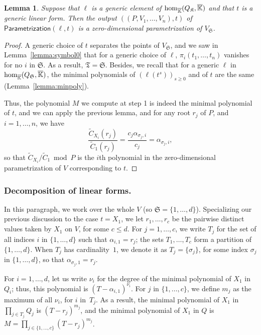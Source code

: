 \documentclass[12pt]{article}
\newtheorem{Lemma}{Lemma}
\def\Kbar {{\ensuremath{\overline{\mathbb{K}}}}}
\begin{document}
\begin{Lemma}
	Suppose that $\ell$ is a generic element of ${\rm
		hom}_{\Kbar}(Q_\mathfrak{K},\Kbar)$ and that $t$ is a generic
	linear form. Then the output $((P,V_1,\dots,V_n),t)$ of
	$\mathsf{Parametrization}(\ell,t)$ is a zero-dimensional
	parametrization of $V_{\mathfrak{S}}$.
\end{Lemma}
\begin{proof}
	A generic choice of $t$ separates the points of $V_{\mathfrak{S}}$,
	and we saw in Lemma~\ref{lemma:symbol0} that for a generic choice of
	$\ell$, $\pi_i(t_1,\dots,t_n)$ vanishes for no $i$ in
	$\mathfrak{S}$.  As a result, $\mathfrak{T}=\mathfrak{S}$.  Besides,
	we recall that for a generic $\ell$ in ${\rm
		hom}_{\Kbar}(Q_\mathfrak{S},\Kbar)$, the minimal polynomials of
	$(\ell(t^s))_{s \ge 0}$ and of $t$ are the same
	(Lemma~\ref{lemma:minpoly}).
	
	Thus, the polynomial $M$ we compute at step 1 is indeed the minimal
	polynomial of $t$, and we can apply the previous lemma, and for 
	any root $r_j$ of $P$, and $i=1,\dots,n$, we have
	$$\frac{\tilde C_{X_i}(r_j)}{\tilde C_1(r_j)}  = \frac{c_j \alpha_{\sigma_j,i}}{c_j} = \alpha_{\sigma_j,i},$$
	so that $\tilde C_{X_i}/\tilde C_1 \bmod P$ is the $i$th polynomial in
	the zero-dimensional parametrization of $V$ corresponding to $t$.
\end{proof}

\subsubsection{Decomposition of linear forms.}

In this paragraph, we work over the whole $V$ (so
$\mathfrak{S}=\{1,\dots,d\}$).  Specializing our previous discussion
to the case $t=X_1$, we let $r_1,\dots,r_c$ be the pairwise distinct
values taken by $X_1$ on $V$, for some $c \le d$.  For
$j=1,\dots,c$, we write $T_j$ for the set of all indices $i$ in
$\{1,\dots,d\}$ such that $\alpha_{i,1}=r_j$; the sets $T_1,\dots,T_c$
form a partition of $\{1,\dots,d\}$. When $T_j$ has cardinality~$1$,
we denote it as $T_j=\{\sigma_j\}$, for some index $\sigma_j$ in
$\{1,\dots,d\}$, so that $\alpha_{\sigma_j,1}=r_j$.

For $i=1,\dots,d$, let us write $\nu_i$ for the degree of the minimal
polynomial of $X_1$ in $Q_i$; thus, this polynomial is
$(T-\alpha_{i,1})^{\nu_i}$. For $j$ in $\{1,\dots,c\}$, we define
$m_j$ as the maximum of all $\nu_i$, for $i$ in~$T_j$. As a result, the minimal
polynomial of $X_1$ in $\prod_{j \in T_j} Q_j$ is 
$(T-r_j)^{m_j}$, and the minimal polynomial of $X_1$ in $Q$ is
$M=\prod_{j \in \{1,\dots,c\}} (T-r_j)^{m_j}$.
\end{document}
